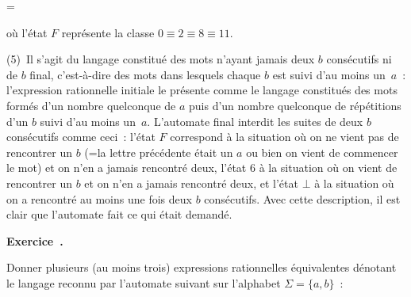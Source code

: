 \documentclass[12pt,a4paper]{article}
\theoremstyle{definition}
\newcommand\exercice{%
\refstepcounter{comcnt}\bigskip\noindent\textbf{Exercice~\thecomcnt.}}
\newif\ifcorrige
\newenvironment{corrige}%
{\ifcorrige\relax\else\setbox0=\vbox\bgroup\fi%
\smallbreak\footnotesize\noindent{\underbar{\textit{Corrigé.}}\quad}}
{{\hbox{}\nobreak\hfill\checkmark}%
\ifcorrige\relax\else\egroup\fi\par}
\begin{document}
\begin{corrige}
\begin{center}

\end{center}
où l'état $F$ représente la classe $0\equiv 2\equiv 8\equiv 11$.

\smallbreak

(5) Il s'agit du langage constitué des mots n'ayant jamais deux $b$
consécutifs ni de $b$ final,
c'est-à-dire des mots dans lesquels chaque $b$ est suivi
d'au moins un $a$ : l'expression rationnelle initiale le présente
comme le langage constitués des mots formés d'un nombre quelconque de
$a$ puis d'un nombre quelconque de répétitions d'un $b$ suivi d'au
moins un $a$.  L'automate final interdit les suites de deux $b$
consécutifs comme ceci : l'état $F$ correspond à la situation où on ne
vient pas de rencontrer un $b$ (=la lettre précédente était un $a$ ou
bien on vient de commencer le mot) et on n'en a jamais rencontré deux,
l'état $6$ à la situation où on vient de rencontrer un $b$ et on n'en
a jamais rencontré deux, et l'état $\bot$ à la situation où on a
rencontré au moins une fois deux $b$ consécutifs.  Avec cette
description, il est clair que l'automate fait ce qui était demandé.
\end{corrige}

%

\exercice

Donner plusieurs (au moins trois) expressions rationnelles
équivalentes dénotant le langage reconnu par l'automate suivant sur
l'alphabet $\Sigma = \{a,b\}$ :
\end{document}
